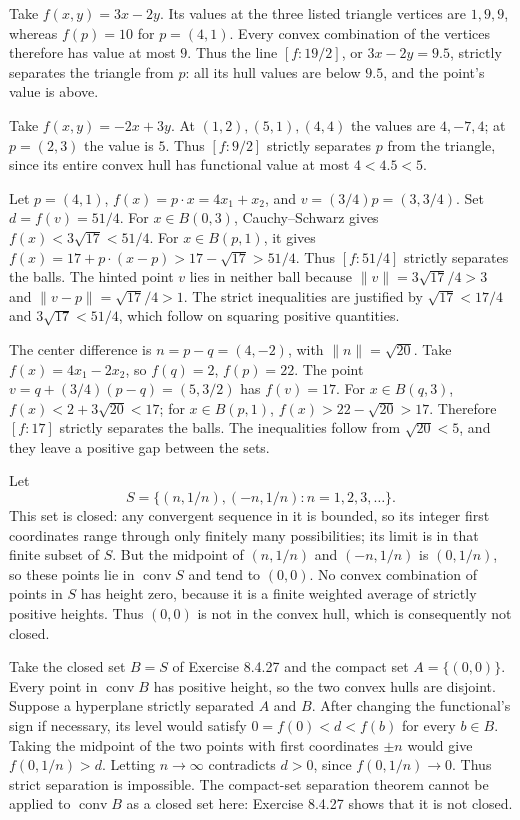 Take $f(x,y)=3x-2y$. Its values at the three listed triangle vertices are
$1,9,9$, whereas $f(p)=10$ for $p=(4,1)$.
Every convex combination of the vertices therefore has value at most $9$.
Thus the line $[f:19/2]$, or $3x-2y=9.5$, strictly separates the triangle
from $p$: all its hull values are below $9.5$, and the point's value is above.

Take $f(x,y)=-2x+3y$. At $(1,2),(5,1),(4,4)$ the values are $4,-7,4$;
at $p=(2,3)$ the value is $5$.
Thus $[f:9/2]$ strictly separates $p$ from the triangle, since its entire
convex hull has functional value at most $4<4.5<5$.

Let $p=(4,1)$, $f(x)=p\cdot x=4x_1+x_2$, and
$v=(3/4)p=(3,3/4)$. Set $d=f(v)=51/4$.
For $x\in B(0,3)$, Cauchy--Schwarz gives $f(x)<3\sqrt{17}<51/4$.
For $x\in B(p,1)$, it gives
$f(x)=17+p\cdot(x-p)>17-\sqrt{17}>51/4$.
Thus $[f:51/4]$ strictly separates the balls.
The hinted point $v$ lies in neither ball because
$\|v\|=3\sqrt{17}/4>3$ and $\|v-p\|=\sqrt{17}/4>1$.
The strict inequalities are justified by $\sqrt{17}<17/4$ and
$3\sqrt{17}<51/4$, which follow on squaring positive quantities.

The center difference is $n=p-q=(4,-2)$, with $\|n\|=\sqrt{20}$.
Take $f(x)=4x_1-2x_2$, so $f(q)=2$, $f(p)=22$.
The point $v=q+(3/4)(p-q)=(5,3/2)$ has $f(v)=17$.
For $x\in B(q,3)$, $f(x)<2+3\sqrt{20}<17$;
for $x\in B(p,1)$, $f(x)>22-\sqrt{20}>17$.
Therefore $[f:17]$ strictly separates the balls. The inequalities follow
from $\sqrt{20}<5$, and they leave a positive gap between the sets.

Let
\[
 S=\{(n,1/n),(-n,1/n):n=1,2,3,\ldots\}.
\]
This set is closed: any convergent sequence in it is bounded, so its
integer first coordinates range through only finitely many possibilities;
its limit is in that finite subset of $S$.
But the midpoint of $(n,1/n)$ and $(-n,1/n)$ is $(0,1/n)$, so these
points lie in $\operatorname{conv}S$ and tend to $(0,0)$.
No convex combination of points in $S$ has height zero, because it is a
finite weighted average of strictly positive heights. Thus $(0,0)$ is not
in the convex hull, which is consequently not closed.

Take the closed set $B=S$ of Exercise 8.4.27 and the compact set
$A=\{(0,0)\}$. Every point in $\operatorname{conv}B$ has positive height,
so the two convex hulls are disjoint.
Suppose a hyperplane strictly separated $A$ and $B$. After changing the
functional's sign if necessary, its level would satisfy
$0=f(0)<d<f(b)$ for every $b\in B$.
Taking the midpoint of the two points with first coordinates $\pm n$
would give $f(0,1/n)>d$. Letting $n\to\infty$ contradicts $d>0$, since
$f(0,1/n)\to0$. Thus strict separation is impossible.
The compact-set separation theorem cannot be applied to $\operatorname{conv}B$
as a closed set here: Exercise 8.4.27 shows that it is not closed.

